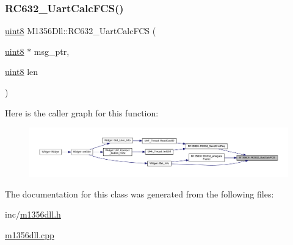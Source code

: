 \subsubsection{\texorpdfstring{RC632\_UartCalcFCS()}{RC632\_UartCalcFCS()}\hspace{0.1cm}{\footnotesize\ttfamily [2/2]}}
{\footnotesize\ttfamily \mbox{\hyperlink{inc_2m1356dll_8h_adde6aaee8457bee49c2a92621fe22b79}{uint8}} M1356\+Dll\+::\+R\+C632\+\_\+\+Uart\+Calc\+F\+CS (\begin{DoxyParamCaption}\item[{\mbox{\hyperlink{inc_2m1356dll_8h_adde6aaee8457bee49c2a92621fe22b79}{uint8}} $\ast$}]{msg\+\_\+ptr,  }\item[{\mbox{\hyperlink{inc_2m1356dll_8h_adde6aaee8457bee49c2a92621fe22b79}{uint8}}}]{len }\end{DoxyParamCaption})}

Here is the caller graph for this function\+:
\nopagebreak
\begin{figure}[H]
\begin{center}
\leavevmode
\includegraphics[width=350pt]{class_m1356_dll_a048d48e3154a48258d25391b19de938c_icgraph}
\end{center}
\end{figure}


The documentation for this class was generated from the following files\+:\begin{DoxyCompactItemize}
\item 
inc/\mbox{\hyperlink{inc_2m1356dll_8h}{m1356dll.\+h}}\item 
\mbox{\hyperlink{m1356dll_8cpp}{m1356dll.\+cpp}}\end{DoxyCompactItemize}

